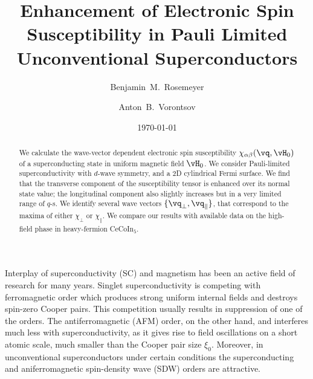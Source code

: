 \documentclass[aps,prl,twocolumn,showpacs,amsmath,amssymb]{revtex4-1}
\newcommand{\cecoin}{CeCoIn$_5$}
\begin{document}
\title{Enhancement of Electronic Spin Susceptibility in Pauli Limited Unconventional Superconductors}

\author{Benjamin~M.~Rosemeyer}
\author{Anton~B.~Vorontsov}


\date{\today}

\begin{abstract}
%
We calculate the wave-vector dependent electronic spin susceptibility 
$\chi_{\alpha\beta}(\vq, \vH_0)$ 
of a superconducting state in uniform magnetic field $\vH_0$. 
We consider Pauli-limited superconductivity with $d$-wave symmetry, and a 2D cylindrical 
Fermi surface.  
We find that the transverse component of the susceptibility tensor is enhanced over its
normal state value;
the longitudinal component also slightly increases but in a very limited range of $q$-s.
We identify several wave vectors $\{\vq_\perp,\vq_\parallel\}$, 
that correspond to the maxima of either $\chi_\perp$ or $\chi_\parallel$. 
We compare our results with available data on the high-field phase in heavy-fermion \cecoin. 
%
\end{abstract} 



\maketitle


%
Interplay of superconductivity (SC) and magnetism %
has been an active field of research for many years.
Singlet superconductivity is competing with ferromagnetic order 
which produces strong uniform internal fields and destroys spin-zero Cooper pairs. 
This competition usually results in suppression of one of the orders. \cite{bulaevskii85}
The antiferromagnetic (AFM) order, on the other hand, and interferes much less with superconductivity, 
as it gives rise to field oscillations on a short atomic scale, much 
smaller than the Cooper pair size $\xi_0$.\cite{anderson_suhl59} 
Moreover, in unconventional superconductors under certain conditions 
the superconducting and aniferromagnetic spin-density wave (SDW) orders 
are attractive.\cite{machida87_sdw_hf,*kato87_sdw_hf}
\end{document}
